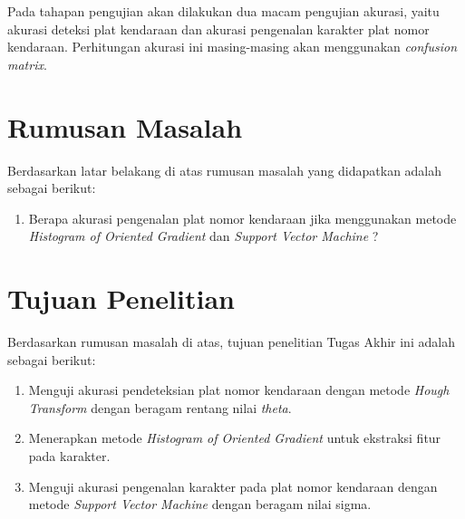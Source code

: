 \noindent Pada tahapan pengujian akan dilakukan dua macam pengujian akurasi, yaitu akurasi deteksi plat kendaraan dan akurasi pengenalan karakter plat nomor kendaraan. Perhitungan akurasi ini masing-masing akan menggunakan \textit{confusion matrix}.\\

\section{Rumusan Masalah}
\noindent Berdasarkan latar belakang di atas rumusan masalah yang didapatkan adalah sebagai berikut:
\begin{enumerate}[nolistsep,leftmargin=0.5cm]
\item Berapa akurasi pengenalan plat nomor kendaraan jika menggunakan metode \textit{Histogram of Oriented Gradient} dan \textit{Support Vector Machine} ? \\
\end{enumerate}

\section{Tujuan Penelitian}
\noindent Berdasarkan rumusan masalah di atas, tujuan penelitian Tugas Akhir ini adalah sebagai berikut:
\begin{enumerate}[nolistsep,leftmargin=0.5cm]
\item Menguji akurasi pendeteksian plat nomor kendaraan dengan metode \textit{Hough Transform} dengan beragam rentang nilai \textit{theta}.
\item Menerapkan metode \textit{Histogram of Oriented Gradient} untuk ekstraksi fitur pada karakter.
\item Menguji akurasi pengenalan karakter pada plat nomor kendaraan dengan metode \textit{Support Vector Machine} dengan beragam nilai sigma.\\
\end{enumerate}

